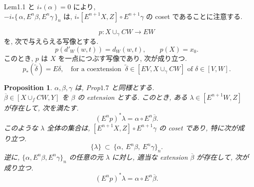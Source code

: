 \documentclass[12pt, leqno]{ltjsarticle}
\newcommand{\Ex}{E}        %
\newcommand{\todai}[2][]{\{\,#2\,\}_{#1}}      %
\numberwithin{equation}{section}
\theoremstyle{plain}
\newtheorem{proposition}[theorem]{Proposition}
\theoremstyle{definition}
\theoremstyle{remark}
\begin{document}
\medskip

Lem1.1 と \(i_*(\alpha) = 0\) により,\\
\(-i_*\todai[n]{\alpha, E^n\beta, E^n\gamma}\) は, 
\(i_*[E^{n+1}X, Z]\circ E^{n+1}\gamma\)
の coset であることに注意する.

\begin{equation}\label{eq:p-def}
p:X\cup_\gamma CW\to EW
\end{equation}
を, 次で与えらえる写像とする.
\[
p(d'_W(w, t)) = d_W(w, t),\qquad
p(X) = x_0.
\]
このとき,
\(p\) は \(X\) を一点につぶす写像であり, 次が成り立つ.
\begin{equation}\label{eq:p-star}
p_*(\widetilde{\delta})=E\delta,
\quad\text{for a coextension }\ 
\widetilde{\delta}\in[EV, X\cup_\gamma CW]
\text{ of }\delta\in[V, W].
\end{equation}

\begin{proposition}\label{prop:1-9}
$\alpha,\beta,\gamma$ は, Prop$1.7$ と同様とする. \\
$\overline\beta\in[X\cup_f CW, Y]$ を $\beta$ の \emph{extension} とする. 
このとき,
ある $\lambda\in[\Ex^{n+1}W, Z]$ が存在して, 次を満たす.
\[
(\Ex^n p)^*\lambda=\alpha\circ \Ex^n\overline\beta.
\]
このような $\lambda$ 全体の集合は,
\(
[\Ex^{n+1}X, Z]\circ \Ex^{n+1}\gamma
\)
の coset であり, 特に次が成り立つ.
\[
\{\lambda\}\ \subset\ \{\alpha,\ \Ex^n\beta,\ \Ex^n\gamma\}_n .
\]
逆に, $\{\alpha,\Ex^n\beta,\Ex^n\gamma\}_n$ の任意の元 $\lambda$ に対し, 
適当な extension $\overline\beta$ が存在して,
次が成り立つ.
\[
(\Ex^n p)^*\lambda=\alpha\circ \Ex^n\overline\beta.
\]
\end{proposition}
\end{document}
